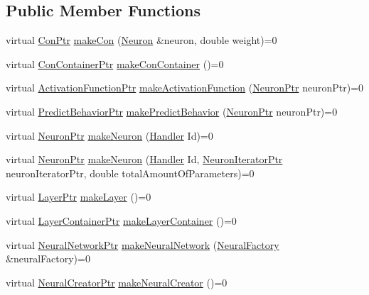 \subsection*{Public Member Functions}
\begin{DoxyCompactItemize}
\item 
virtual \hyperlink{_a_m_o_r_e_8h_a169bb8e5f26ce70bf2b10dec2fb5ee50}{ConPtr} \hyperlink{class_neural_factory_a0d11171bb9e5d09544e8d58a9324b923}{makeCon} (\hyperlink{class_neuron}{Neuron} \&neuron, double weight)=0
\item 
virtual \hyperlink{_a_m_o_r_e_8h_a1021dbaf961d1c8da6d58a8566e5778b}{ConContainerPtr} \hyperlink{class_neural_factory_a4fa5f4f57a2551c95481146b1a0c83d7}{makeConContainer} ()=0
\item 
virtual \hyperlink{_a_m_o_r_e_8h_a77602a0277a02e5769c3df0adc669b17}{ActivationFunctionPtr} \hyperlink{class_neural_factory_a678ec16456e5772a2c188c475a78c588}{makeActivationFunction} (\hyperlink{_a_m_o_r_e_8h_ac1ea936c2c7728eb382278131652fef4}{NeuronPtr} neuronPtr)=0
\item 
virtual \hyperlink{_a_m_o_r_e_8h_a1fb2f1f8fdf1e08c42ef4bdce436af93}{PredictBehaviorPtr} \hyperlink{class_neural_factory_a3d49ef5f05c82cc2c614e884ed3a27d5}{makePredictBehavior} (\hyperlink{_a_m_o_r_e_8h_ac1ea936c2c7728eb382278131652fef4}{NeuronPtr} neuronPtr)=0
\item 
virtual \hyperlink{_a_m_o_r_e_8h_ac1ea936c2c7728eb382278131652fef4}{NeuronPtr} \hyperlink{class_neural_factory_a12abbf93f829aab585975f157c8c98f7}{makeNeuron} (\hyperlink{_a_m_o_r_e_8h_abc871abb71cff6655b8172ee7240b8ef}{Handler} Id)=0
\item 
virtual \hyperlink{_a_m_o_r_e_8h_ac1ea936c2c7728eb382278131652fef4}{NeuronPtr} \hyperlink{class_neural_factory_a19c08ba7ad05ef7af05f7595dda2100b}{makeNeuron} (\hyperlink{_a_m_o_r_e_8h_abc871abb71cff6655b8172ee7240b8ef}{Handler} Id, \hyperlink{_a_m_o_r_e_8h_aa794539c0a68e4eb451e7a2cc6294acc}{NeuronIteratorPtr} neuronIteratorPtr, double totalAmountOfParameters)=0
\item 
virtual \hyperlink{_a_m_o_r_e_8h_acce4b66db3921b7326fbe1a04a56e5fc}{LayerPtr} \hyperlink{class_neural_factory_a1a02bc2427430c4085654a72a03a5f4f}{makeLayer} ()=0
\item 
virtual \hyperlink{_a_m_o_r_e_8h_af261b546158af61fc27686fb926961f2}{LayerContainerPtr} \hyperlink{class_neural_factory_a10b5056a57cc3fef56c66da1ad367fc7}{makeLayerContainer} ()=0
\item 
virtual \hyperlink{_a_m_o_r_e_8h_a7adadf1c313313507b00cd1193db29a1}{NeuralNetworkPtr} \hyperlink{class_neural_factory_a15b9308e868ca439869b1d68afabfcde}{makeNeuralNetwork} (\hyperlink{class_neural_factory}{NeuralFactory} \&neuralFactory)=0
\item 
virtual \hyperlink{_a_m_o_r_e_8h_aefebabe3353f684b7708712480c15699}{NeuralCreatorPtr} \hyperlink{class_neural_factory_a2c7502e1bf81d3fc33284123d733428e}{makeNeuralCreator} ()=0
\end{DoxyCompactItemize}


